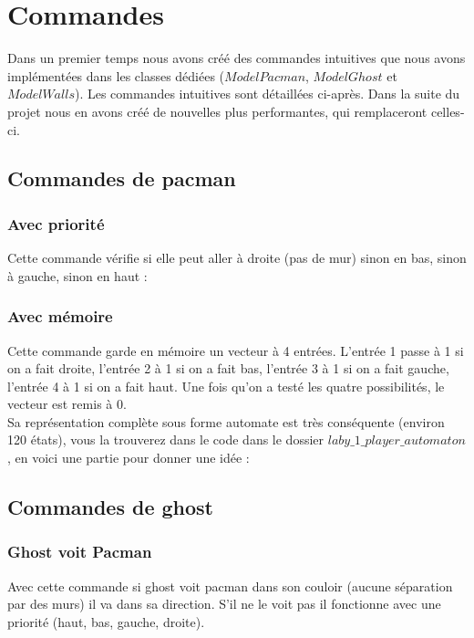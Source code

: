 \chapter{Commandes} \label{sec:commandes}

Dans un premier temps nous avons créé des commandes intuitives que nous avons implémentées dans les classes dédiées ($ModelPacman$, $ModelGhost$ et $ModelWalls$). Les commandes intuitives sont détaillées ci-après. Dans la suite du projet nous en avons créé de nouvelles plus performantes, qui remplaceront celles-ci.

\section{Commandes de pacman} \label{sec:commandePacman}
\subsection{Avec priorité}
Cette commande vérifie si elle peut aller à droite (pas de mur) sinon en bas, sinon à gauche, sinon en haut :\\
\subsection{Avec mémoire}
Cette commande garde en mémoire un vecteur à 4 entrées. L'entrée 1 passe à 1 si on a fait droite, l'entrée 2 à 1 si on a fait bas, l'entrée 3 à 1 si on a fait gauche, l'entrée 4 à 1 si on a fait haut. Une fois qu'on a testé les quatre possibilités, le vecteur est remis à 0.\\
Sa représentation complète sous forme automate est très conséquente (environ 120 états), vous la trouverez dans le code dans le dossier $laby\_1\_player\_automaton$, en voici une partie pour donner une idée :

\section{Commandes de ghost}\label{sec:commandeGhost}
\subsection{Ghost voit Pacman}
Avec cette commande si ghost voit pacman dans son couloir (aucune séparation par des murs) il va dans sa direction. S'il ne le voit pas il fonctionne avec une priorité (haut, bas, gauche, droite).
